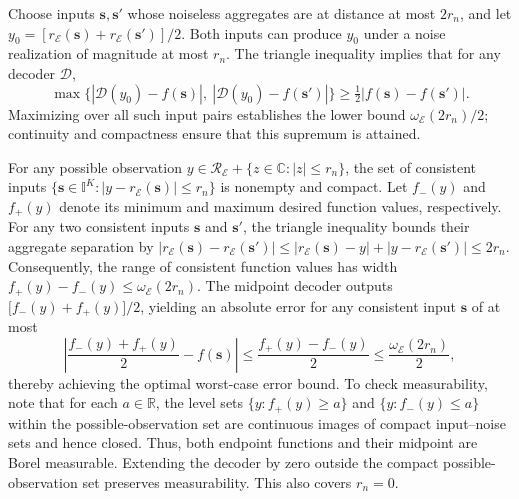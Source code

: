\documentclass[journal,12pt,onecolumn,draftclsnofoot]{IEEEtran}
\newcommand{\enc}{\mathscr{E}}\newcommand{\dec}{\mathscr{D}}\newcommand{\R}{\mathbb R}\newcommand{\C}{\mathbb C}
\begin{document}
Choose inputs $\boldsymbol s,\boldsymbol s'$ whose noiseless aggregates are at distance at most $2r_n$, and let $y_0=[r_\enc(\boldsymbol s)+r_\enc(\boldsymbol s')]/2$. 
Both inputs can produce $y_0$ under a noise realization of magnitude at most $r_n$. 
The triangle inequality implies that for any decoder $\dec$,
$$
\max\bigl\{|\dec(y_0)-f(\boldsymbol s)|,\ |\dec(y_0)-f(\boldsymbol s')|\bigr\}
\ge\tfrac12|f(\boldsymbol s)-f(\boldsymbol s')|.
$$
Maximizing over all such input pairs establishes the lower bound $\omega_\enc(2r_n)/2$; continuity and compactness ensure that this supremum is attained.


For any possible observation
$y\in\mathcal R_\enc+\{z\in\C:|z|\le r_n\}$, the set of consistent inputs $\{\boldsymbol s\in\mathbb I^K:|y-r_\enc(\boldsymbol s)|\le r_n\}$ is nonempty and compact. 
Let $f_-(y)$ and $f_+(y)$ denote its minimum and maximum desired function values, respectively. 
For any two consistent inputs $\boldsymbol s$ and $\boldsymbol s'$, the triangle inequality bounds their aggregate separation by $|r_\enc(\boldsymbol s)-r_\enc(\boldsymbol s')|\le|r_\enc(\boldsymbol s)-y|+|y-r_\enc(\boldsymbol s')|\le2r_n$. 
Consequently, the range of consistent function values has width $f_+(y)-f_-(y)\le\omega_\enc(2r_n)$. 
The midpoint decoder outputs $\bigl[f_-(y)+f_+(y)\bigr]/2$, yielding an absolute error for any consistent input $\boldsymbol s$ of at most
$$
\left|\frac{f_-(y)+f_+(y)}2-f(\boldsymbol s)\right|
\le\frac{f_+(y)-f_-(y)}2
\le\frac{\omega_\enc(2r_n)}2,
$$
thereby achieving the optimal worst-case error bound. To check measurability, note that for each $a\in\R$, the level sets $\{y:f_+(y)\ge a\}$ and
$\{y:f_-(y)\le a\}$ within the possible-observation set are
continuous images of compact input--noise sets and hence closed.
Thus, both endpoint functions and their midpoint are Borel measurable.
Extending the decoder by zero outside the compact possible-observation
set preserves measurability. This also covers $r_n=0$.

\end{document}
